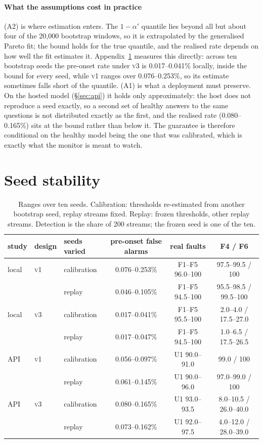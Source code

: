 \documentclass{article}
\newcommand{\vone}{\textsc{v1}}
\newcommand{\vthree}{\textsc{v3}}
\begin{document}
\paragraph{What the assumptions cost in practice}
(A2) is where estimation enters. The $1-\alpha'$ quantile lies beyond all but
about four of the 20{,}000 bootstrap windows, so it is extrapolated by the
generalised Pareto fit; the bound holds for the true quantile, and the realised
rate depends on how well the fit estimates it. Appendix~\ref{app:seeds} measures
this directly: across ten bootstrap seeds the pre-onset rate under \vthree{} is
0.017--0.041\% locally, inside the bound for every seed, while \vone{} ranges over
0.076--0.253\%, so its estimate sometimes falls short of the quantile. (A1) is what a
deployment must preserve. On the hosted model (\S\ref{sec:api}) it holds only
approximately: the host does not reproduce a seed exactly, so a second set of
healthy answers to the same questions is not distributed exactly as the first, and
the realised rate (0.080--0.165\%) sits at the bound rather than below it. The
guarantee is therefore conditional on the healthy model being the one that was
calibrated, which is exactly what the monitor is meant to watch.

\section{Seed stability}
\label{app:seeds}
\begin{table}[t]
  \centering\small
  \caption{Ranges over ten seeds. Calibration: thresholds re-estimated from
  another bootstrap seed, replay streams fixed. Replay: frozen thresholds, other
  replay streams. Detection is the share of 200 streams; the frozen seed is one of
  the ten.}
  \label{tab:seeds}
  \setlength{\tabcolsep}{4pt}
  \begin{tabular}{lllccc}
    \toprule
    study & design & seeds varied & pre-onset false alarms & real faults & F4 / F6 \\
    \midrule
    local & \vone{} & calibration & 0.076--0.253\% & F1--F5 96.0--100 & 97.5--99.5 / 100 \\
          &         & replay      & 0.046--0.105\% & F1--F5 94.5--100 & 95.5--98.5 / 99.5--100 \\
    local & \vthree{} & calibration & 0.017--0.041\% & F1--F5 95.5--100 & 2.0--4.0 / 17.5--27.0 \\
          &           & replay      & 0.017--0.047\% & F1--F5 94.5--100 & 1.0--6.5 / 17.5--26.5 \\
    \addlinespace
    API & \vone{} & calibration & 0.056--0.097\% & U1 90.0--91.0 & 99.0 / 100 \\
        &         & replay      & 0.061--0.145\% & U1 90.0--96.0 & 97.0--99.0 / 100 \\
    API & \vthree{} & calibration & 0.080--0.165\% & U1 93.0--93.5 & 8.0--10.5 / 26.0--40.0 \\
        &           & replay      & 0.073--0.162\% & U1 92.0--97.5 & 4.0--12.0 / 28.0--39.0 \\
    \bottomrule
  \end{tabular}
\end{table}
\end{document}
